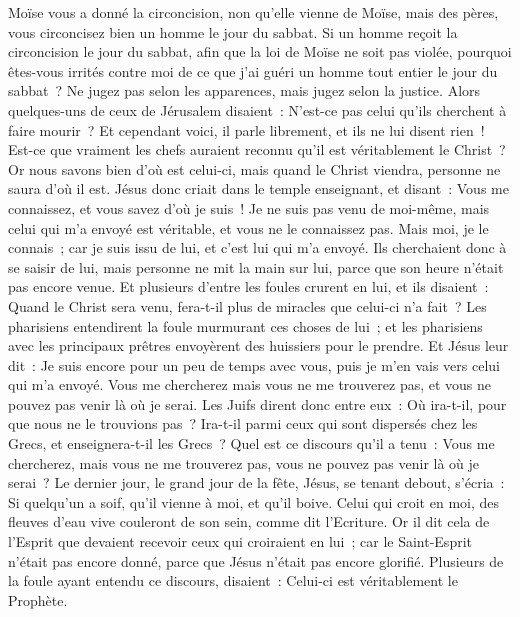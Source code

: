 \begin{multicols}{2}
Moïse vous a donné la circoncision, non qu'elle vienne de Moïse, mais des pères, vous circoncisez bien un homme le jour du sabbat.
Si un homme reçoit la circoncision le jour du sabbat, afin que la loi de Moïse ne soit pas violée, pourquoi êtes-vous irrités contre moi de ce que j'ai guéri un homme tout entier le jour du sabbat~?
Ne jugez pas selon les apparences, mais jugez selon la justice.
Alors quelques-uns de ceux de Jérusalem disaient~: N'est-ce pas celui qu'ils cherchent à faire mourir~?
Et cependant voici, il parle librement, et ils ne lui disent rien~! Est-ce que vraiment les chefs auraient reconnu qu'il est véritablement le Christ~?
Or nous savons bien d'où est celui-ci, mais quand le Christ viendra, personne ne saura d'où il est.
Jésus donc criait dans le temple enseignant, et disant~: Vous me connaissez, et vous savez d'où je suis~! Je ne suis pas venu de moi-même, mais celui qui m'a envoyé est véritable, et vous ne le connaissez pas. 
Mais moi, je le connais~; car je suis issu de lui, et c'est lui qui m'a envoyé.
Ils cherchaient donc à se saisir de lui, mais personne ne mit la main sur lui, parce que son heure n'était pas encore venue.
Et plusieurs d'entre les foules crurent en lui, et ils disaient~: Quand le Christ sera venu, fera-t-il plus de miracles que celui-ci n'a fait~?
Les pharisiens entendirent la foule murmurant ces choses de lui~; et les pharisiens avec les principaux prêtres envoyèrent des huissiers pour le prendre.
Et Jésus leur dit~: Je suis encore pour un peu de temps avec vous, puis je m'en vais vers celui qui m'a envoyé.
Vous me chercherez mais vous ne me trouverez pas, et vous ne pouvez pas venir là où je serai.
Les Juifs dirent donc entre eux~: Où ira-t-il, pour que nous ne le trouvions pas~? Ira-t-il parmi ceux qui sont dispersés chez les Grecs, et enseignera-t-il les Grecs~?
Quel est ce discours qu'il a tenu~: Vous me chercherez, mais vous ne me trouverez pas, vous ne pouvez pas venir là où je serai~?
Le dernier jour, le grand jour de la fête, Jésus, se tenant debout, s'écria~: Si quelqu'un a soif, qu'il vienne à moi, et qu'il boive.
Celui qui croit en moi, des fleuves d'eau vive couleront de son sein, comme dit l'Ecriture.
Or il dit cela de l'Esprit que devaient recevoir ceux qui croiraient en lui~; car le Saint-Esprit n'était pas encore donné, parce que Jésus n'était pas encore glorifié.
Plusieurs de la foule ayant entendu ce discours, disaient~: Celui-ci est véritablement le Prophète.

\end{multicols}
